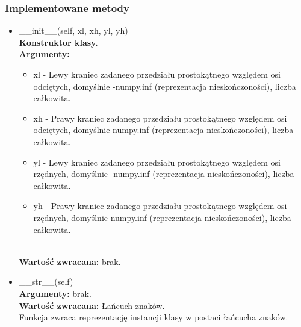 \documentclass{article}
\begin{document}
            \subsubsection{Implementowane metody}
                \begin{itemize}
                    \item \_\_init\_\_(self, xl, xh, yl, yh)\\
                        \textbf{Konstruktor klasy.} \\
                        \textbf{Argumenty:} \begin{itemize}
                            \item xl - Lewy kraniec zadanego przedziału prostokątnego względem osi odciętych, domyślnie -numpy.inf (reprezentacja nieskończoności), liczba całkowita. 
                
                            \item xh - Prawy kraniec zadanego przedziału prostokątnego względem osi odciętych, domyślnie numpy.inf (reprezentacja nieskończoności), liczba całkowita. 
                
                            \item yl - Lewy kraniec zadanego przedziału prostokątnego względem osi rzędnych, domyślnie -numpy.inf (reprezentacja nieskończoności), liczba całkowita. 
                
                            \item yh - Prawy kraniec zadanego przedziału prostokątnego względem osi rzędnych, domyślnie numpy.inf (reprezentacja nieskończoności), liczba całkowita.
                        \end{itemize}\\
                        \textbf{Wartość zwracana:} brak.

                    
                    \item \_\_str\_\_(self)\\
                        \textbf{Argumenty:} brak.\\
                        \textbf{Wartość zwracana:} Łańcuch znaków. \\
                        Funkcja zwraca reprezentację instancji klasy w postaci łańcucha znaków. 
                    

\end{itemize}
\end{document}
